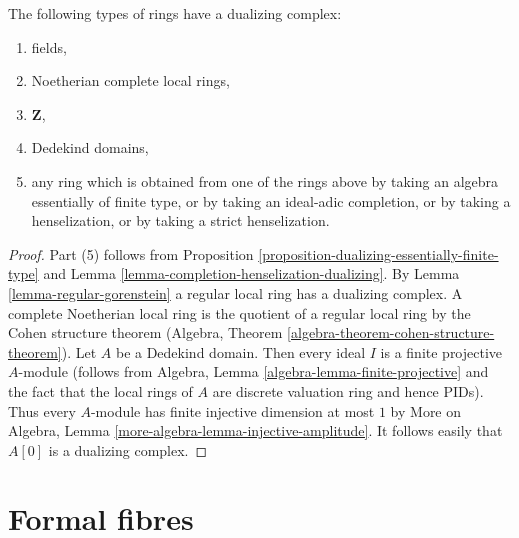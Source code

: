 \begin{lemma}
\label{lemma-ubiquity-dualizing}
The following types of rings have a dualizing complex:
\begin{enumerate}
\item fields,
\item Noetherian complete local rings,
\item $\mathbf{Z}$,
\item Dedekind domains,
\item any ring which is obtained from one of the rings above by
taking an algebra essentially of finite type, or by taking an
ideal-adic completion, or by taking a henselization, 
or by taking a strict henselization.
\end{enumerate}
\end{lemma}

\begin{proof}
Part (5) follows from Proposition
\ref{proposition-dualizing-essentially-finite-type}
and Lemma \ref{lemma-completion-henselization-dualizing}.
By Lemma \ref{lemma-regular-gorenstein} a regular local ring has a
dualizing complex.
A complete Noetherian local ring is the quotient of a regular
local ring by the Cohen structure theorem
(Algebra, Theorem \ref{algebra-theorem-cohen-structure-theorem}).
Let $A$ be a Dedekind domain. Then every ideal $I$ is a finite
projective $A$-module (follows from
Algebra, Lemma \ref{algebra-lemma-finite-projective}
and the fact that the local rings of $A$ are discrete valuation ring
and hence PIDs). Thus every $A$-module has finite injective dimension
at most $1$ by
More on Algebra, Lemma \ref{more-algebra-lemma-injective-amplitude}.
It follows easily that $A[0]$ is a dualizing complex.
\end{proof}





\section{Formal fibres}
\label{section-formal-fibres}

